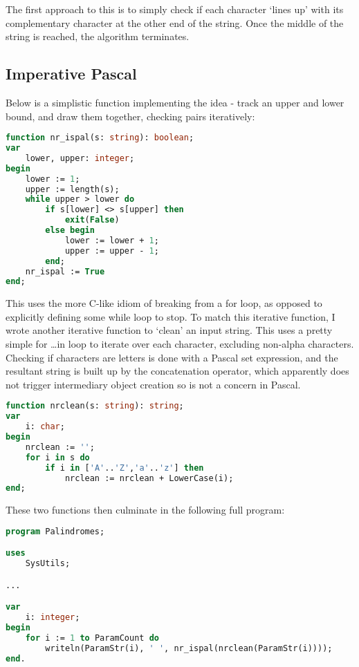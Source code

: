 \documentclass[fleqn,a4paper,11pt]{article}
\begin{document}
    The first approach to this is to simply check if each character `lines up'
    with its complementary character at the other end of the string. Once the
    middle of the string is reached, the algorithm terminates.

    \subsection{Imperative Pascal}

    Below is a simplistic function implementing the idea - track an upper and
    lower bound, and draw them together, checking pairs iteratively:

\begin{lstlisting}[language=Pascal, caption=Nonrecursive palindrome function in Pascal]
function nr_ispal(s: string): boolean;
var
    lower, upper: integer;
begin
    lower := 1;
    upper := length(s);
    while upper > lower do
        if s[lower] <> s[upper] then
            exit(False)
        else begin
            lower := lower + 1;
            upper := upper - 1;
        end;
    nr_ispal := True
end;
\end{lstlisting}

    This uses the more C-like idiom of breaking from a for loop, as opposed to
    explicitly defining some while loop to stop. To match this iterative
    function, I wrote another iterative function to `clean' an input string.
    This uses a pretty simple for \ldots in loop to iterate over each character,
    excluding non-alpha characters. Checking if characters are letters is done
    with a Pascal set expression, and the resultant string is built up by the
    concatenation operator, which apparently does not trigger intermediary
    object creation so is not a concern in Pascal.

\begin{lstlisting}[language=Pascal, caption=Nonrecursive `clean' function in Pascal]
function nrclean(s: string): string;
var
    i: char;
begin
    nrclean := '';
    for i in s do
        if i in ['A'..'Z','a'..'z'] then
            nrclean := nrclean + LowerCase(i);
end;
\end{lstlisting}

    These two functions then culminate in the following full program:

\begin{lstlisting}[language=Pascal, caption=Remainder of nonrecursive Pascal program]
program Palindromes;

uses
    SysUtils;

...

var
    i: integer;
begin
    for i := 1 to ParamCount do
        writeln(ParamStr(i), ' ', nr_ispal(nrclean(ParamStr(i))));
end.
\end{lstlisting}
\end{document}
